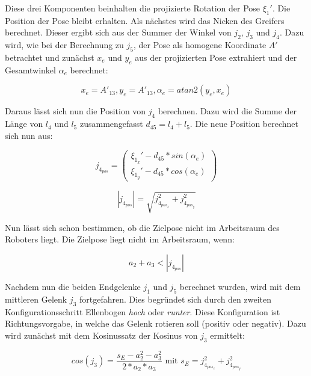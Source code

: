Diese drei Komponenten beinhalten die projizierte Rotation der Pose $\xi_1'$. Die Position der Pose bleibt erhalten. Als nächstes wird das Nicken des Greifers berechnet. Dieser ergibt sich aus der Summer der Winkel von $j_2$, $j_3$ und $j_4$. Dazu wird, wie bei der Berechnung zu $j_5$, der Pose als homogene Koordinate $A'$ betrachtet und zunächst $x_{e}$ und $y_{e}$ aus der projizierten Pose extrahiert und der Gesamtwinkel $\alpha_{e}$ berechnet:

\begin{equation}
x_{e} = A'_{13}, y_{e} = A'_{13}, \alpha_{e} = atan2(y_{e}, x_{e})
\label{eq:28}
\end{equation}

Daraus lässt sich nun die Position von $j_4$ berechnen. Dazu wird die Summe der Länge von $l_4$ und $l_5$ zusammengefasst $d_{45} = l_4 + l_5$. Die neue Position berechnet sich nun aus:

\begin{equation}
j_{4_{pos}} = 
\left(\begin{array}{c} 
\xi_{1_x}' - d_{45} * sin(\alpha_{e})\\
\xi_{1_y}' - d_{45} * cos(\alpha_{e})
\end{array}\right)
\label{eq:29}
\end{equation}

\begin{equation}
|j_{4_{pos}}| = \sqrt{j_{4_{pos_x}}^2 + j_{4_{pos_y}}^2}
\label{eq:31}
\end{equation}

Nun lässt sich schon bestimmen, ob die Zielpose nicht im Arbeitsraum des Roboters liegt. Die Zielpose liegt nicht im Arbeitsraum, wenn:

\begin{equation}
a_2 + a_3 < |j_{4_{pos}}|
\label{eq:30}
\end{equation}

Nachdem nun die beiden Endgelenke $j_1$ und $j_5$ berechnet wurden, wird mit dem mittleren Gelenk $j_3$ fortgefahren. Dies begründet sich durch den zweiten Konfigurationsschritt Ellenbogen \textit{hoch} oder \textit{runter}. Diese Konfiguration ist Richtungsvorgabe, in welche das Gelenk rotieren soll (positiv oder negativ). Dazu wird zunächst mit dem Kosinussatz der Kosinus von $j_3$ ermittelt:

\begin{equation}
cos(j_3) = \dfrac{s_E - a_2^2 - a_3^2}{2 * a_2 * a_3} \text{ mit } s_E = j_{4_{pos_x}}^2 + j_{4_{pos_y}}^2 
\label{eq:32}
\end{equation}

